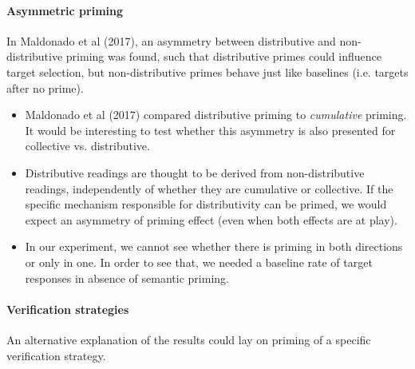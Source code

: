 \documentclass[a4paper]{article}
\begin{document}
\paragraph{Asymmetric priming}
In Maldonado et al (2017), an asymmetry between distributive and non-distributive priming was found, such that distributive primes could influence target selection, but non-distributive primes behave just like baselines (i.e. targets after no prime). 
\begin{itemize}
\item Maldonado et al (2017) compared distributive priming to \emph{cumulative} priming. It would be interesting to test whether this asymmetry is also presented for collective vs. distributive. 

\item Distributive readings are thought to be derived from non-distributive readings, independently of whether they are cumulative or collective. If the specific mechanism responsible for distributivity can be primed, we would expect an asymmetry of priming effect (even when both effects are at play). 

\item In our experiment, we cannot see whether there is priming in both directions or only in one. In order to see that, we needed a baseline rate of target responses in absence of semantic priming.

\end{itemize}

\paragraph{Verification strategies}
An alternative explanation of the results could lay on priming of a specific verification strategy. 
\end{document}
